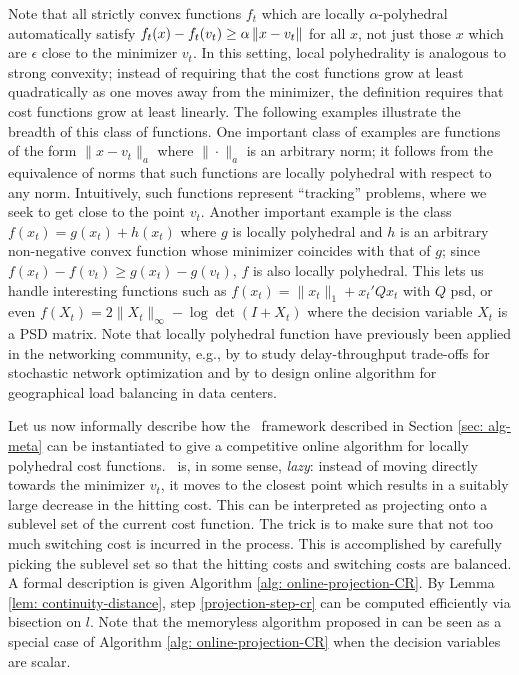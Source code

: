 Note that all strictly convex functions $f_t$ which are locally $\alpha$-polyhedral automatically satisfy $f_t(x) - f_t(v_t) \ge \alpha \left\lVert x - v_t \right\rVert$ for all $x$, not just those $x$ which are $\epsilon$ close to the minimizer $v_t$. In this setting, local polyhedrality  is analogous to strong convexity; instead of requiring that the cost functions grow at least quadratically as one moves away from the minimizer, the definition requires that cost functions grow at least linearly. The following examples illustrate the breadth of this class of functions. One important class of examples are functions of the form $\|x - v_t \|_a$ where $\| \cdot \|_a$ is an arbitrary norm; it follows from the equivalence of norms that such functions are locally polyhedral with respect to any norm. Intuitively, such functions represent ``tracking'' problems, where we seek to get close to the point $v_t$. Another important example  is the class $f(x_t) = g(x_t) + h(x_t)$ where $g$ is locally polyhedral and $h$ is an arbitrary non-negative convex function whose minimizer coincides with that of $g$; since $f(x_t) - f(v_t) \geq g(x_t) - g(v_t)$, $f$ is also locally polyhedral. This lets us handle interesting functions such as $f(x_t) = \|x_t\|_1 + x_t' Q x_t$ with $Q$ psd, or even $f(X_t) = 2\|X_t\|_{\infty}  -\log{\det{\left( I + X_t \right)}}$ where the decision variable $X_t$ is a PSD matrix. Note that locally polyhedral function have previously been applied in the networking community, e.g., by \cite{huang2011} to study delay-throughput trade-offs for stochastic network optimization and by \cite{lin2012} to design online algorithm for geographical load balancing in data centers.   
 
Let us now informally describe how the \ouralg\ framework described in Section \ref{sec: alg-meta} can be instantiated to give a competitive online algorithm for locally polyhedral cost functions.  \ouralg\ is, in some sense, \textit{lazy}: instead of moving directly towards the minimizer $v_t$, it moves to the closest point which results in a suitably large decrease in the hitting cost. This can be interpreted as projecting onto a sublevel set of the current cost function. The trick is to make sure that not too much switching cost is incurred in the process. This is accomplished by carefully picking the sublevel set so that the hitting costs and switching costs are balanced. A formal description is given Algorithm \ref{alg: online-projection-CR}. By Lemma \ref{lem: continuity-distance}, step \ref{projection-step-cr} can be computed efficiently via bisection on $l$. Note that the memoryless algorithm proposed in \cite{bansal2015} can be seen as a special case of Algorithm \ref{alg: online-projection-CR} when the decision variables are scalar. %


